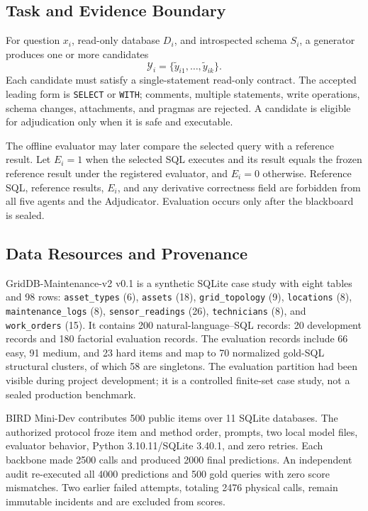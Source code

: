 \documentclass[applsci,article,submit,moreauthors]{Definitions/mdpi}
\begin{document}
\subsection{Task and Evidence Boundary}

For question $x_i$, read-only database $D_i$, and introspected schema $S_i$, a generator produces one or more candidates
\begin{equation}
\mathcal{Y}_i=\{\widetilde{y}_{i1},\ldots,\widetilde{y}_{ik}\}.
\end{equation}
Each candidate must satisfy a single-statement read-only contract. The accepted leading form is \texttt{SELECT} or \texttt{WITH}; comments, multiple statements, write operations, schema changes, attachments, and pragmas are rejected. A candidate is eligible for adjudication only when it is safe and executable.

The offline evaluator may later compare the selected query with a reference result. Let $E_i=1$ when the selected SQL executes and its result equals the frozen reference result under the registered evaluator, and $E_i=0$ otherwise. Reference SQL, reference results, $E_i$, and any derivative correctness field are forbidden from all five agents and the Adjudicator. Evaluation occurs only after the blackboard is sealed.

\subsection{Data Resources and Provenance}

GridDB-Maintenance-v2 v0.1 is a synthetic SQLite case study with eight tables and 98 rows: \texttt{asset\_types} (6), \texttt{assets} (18), \texttt{grid\_topology} (9), \texttt{locations} (8), \texttt{maintenance\_logs} (8), \texttt{sensor\_readings} (26), \texttt{technicians} (8), and \texttt{work\_orders} (15). It contains 200 natural-language--SQL records: 20 development records and 180 factorial evaluation records. The evaluation records include 66 easy, 91 medium, and 23 hard items and map to 70 normalized gold-SQL structural clusters, of which 58 are singletons. The evaluation partition had been visible during project development; it is a controlled finite-set case study, not a sealed production benchmark.

BIRD Mini-Dev contributes 500 public items over 11 SQLite databases. The authorized protocol froze item and method order, prompts, two local model files, evaluator behavior, Python 3.10.11/SQLite 3.40.1, and zero retries. Each backbone made 2500 calls and produced 2000 final predictions. An independent audit re-executed all 4000 predictions and 500 gold queries with zero score mismatches. Two earlier failed attempts, totaling 2476 physical calls, remain immutable incidents and are excluded from scores.
\end{document}
